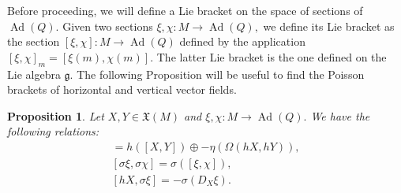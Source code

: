 \documentclass[12pt, letterpaper, reqno]{amsart}
\theoremstyle{definition}
\theoremstyle{plain}
\newtheorem{prop}{Proposition}
\theoremstyle{remark}
\begin{document}
Before proceeding, we will define a Lie bracket on the space of sections of $ \operatorname{Ad} (Q).$ Given two sections $ \xi,\chi: M \rightarrow \operatorname{Ad} (Q), $ we define its Lie bracket as the section $[\xi, \chi] : M \rightarrow \operatorname{Ad} (Q)$ defined by the application $ [\xi, \chi]_m= [\xi(m), \chi(m)]. $ The latter Lie bracket is the one defined on the Lie algebra $ \mathfrak{g}. $   The following Proposition will be useful to find the Poisson brackets of horizontal and vertical vector fields.

\begin{prop}
	Let $ X,Y\in \mathfrak{X}(M) $ and $ \xi,\chi: M \rightarrow \operatorname{Ad} (Q). $ We have the following relations:
\begin{align}
 [hX, hY] = h([X,Y])\oplus -\eta(\Omega(hX,hY)), \label{eq:horizontal-horizontal}\\
 [\sigma\xi, \sigma\chi] = \sigma([\xi,\chi]), \label{eq:vertical-vertical} \\
 [hX,\sigma \xi] = - \sigma(D_X\xi). \label{eq:horizontal-vertical} 
\end{align}

\end{prop}
\end{document}

